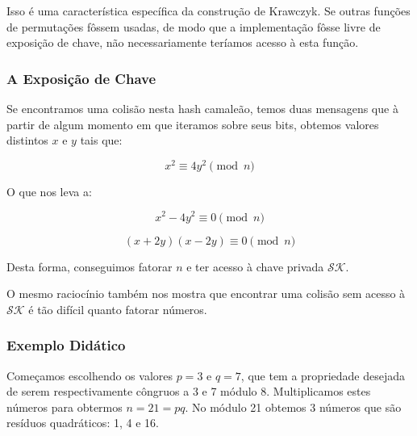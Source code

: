 \documentclass[a4paper]{article}
\begin{document}
Isso é uma característica específica da construção de Krawczyk. Se
outras funções de permutações fôssem usadas, de modo que a
implementação fôsse livre de exposição de chave, não necessariamente
teríamos acesso à esta função.

\subsubsection{A Exposição de Chave}

Se encontramos uma colisão nesta hash camaleão, temos duas mensagens
que à partir de algum momento em que iteramos sobre seus bits, obtemos
valores distintos $x$ e $y$ tais que:

$$
x^2 \equiv 4y^2 \pmod n
$$

O que nos leva a:

$$
x^2 - 4y^2 \equiv 0 \pmod n
$$

$$
(x+2y)(x-2y) \equiv 0 \pmod n
$$

Desta forma, conseguimos fatorar $n$ e ter acesso à chave privada
$\mathcal{SK}$.

O mesmo raciocínio também nos mostra que encontrar uma colisão sem
acesso à $\mathcal{SK}$ é tão difícil quanto fatorar números.





  

\subsubsection{Exemplo Didático}

Começamos escolhendo os valores $p=3$ e $q=7$, que tem a propriedade
desejada de serem respectivamente côngruos a 3 e 7 módulo
8. Multiplicamos estes números para obtermos $n = 21 = pq$. No módulo
21 obtemos 3 números que são resíduos quadráticos: 1, 4 e 16.
\end{document}
